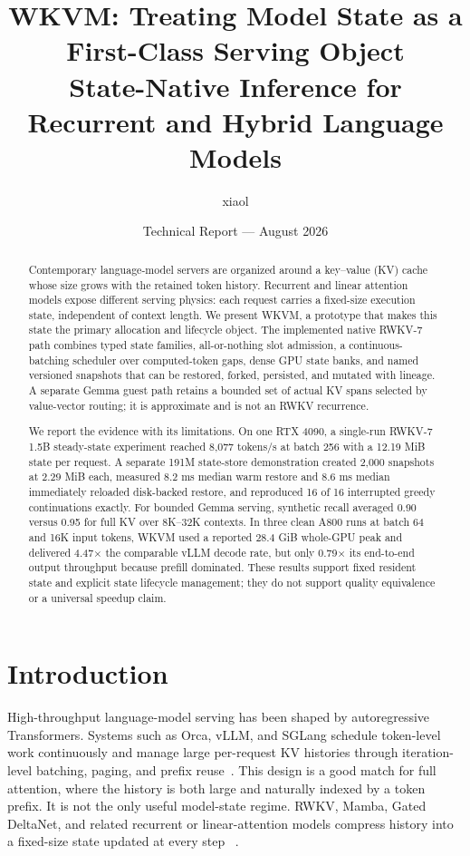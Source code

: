 \documentclass[10pt,letterpaper]{article}
\title{\textbf{WKVM: Treating Model State as a First-Class Serving Object}\\
\large State-Native Inference for Recurrent and Hybrid Language Models}
\author{xiaol}
\date{Technical Report --- August 2026}
\newcommand{\wkvm}{\textsc{WKVM}}
\begin{document}
\maketitle

\begin{abstract}
Contemporary language-model servers are organized around a key--value (KV)
cache whose size grows with the retained token history.  Recurrent and linear
attention models expose different serving physics: each request carries a
fixed-size execution state, independent of context length.  We present
\wkvm, a prototype that makes this state the primary allocation and lifecycle
object.  The implemented native RWKV-7 path combines typed state families,
all-or-nothing slot admission, a continuous-batching scheduler over
computed-token gaps, dense GPU state banks, and named versioned snapshots that
can be restored, forked, persisted, and mutated with lineage.  A separate Gemma
guest path retains a bounded set of actual KV spans selected by value-vector
routing; it is approximate and is not an RWKV recurrence.

We report the evidence with its limitations.  On one RTX 4090, a single-run
RWKV-7 1.5B steady-state experiment reached 8,077 tokens/s at batch 256 with a
12.19 MiB state per request.  A separate 191M state-store demonstration created
2,000 snapshots at 2.29 MiB each, measured 8.2 ms median warm restore and 8.6 ms
median immediately reloaded disk-backed restore, and reproduced 16 of 16
interrupted greedy continuations exactly.  For bounded Gemma serving, synthetic
recall averaged 0.90 versus 0.95 for full KV over 8K--32K contexts.  In three
clean A800 runs at batch 64 and 16K input tokens, \wkvm{} used a reported
28.4 GiB whole-GPU peak and delivered 4.47$\times$ the comparable vLLM decode
rate, but only 0.79$\times$ its end-to-end output throughput because prefill
dominated.  These results support fixed resident state and explicit state
lifecycle management; they do not support quality equivalence or a universal
speedup claim.
\end{abstract}

\section{Introduction}

High-throughput language-model serving has been shaped by autoregressive
Transformers.  Systems such as Orca, vLLM, and SGLang schedule token-level work
continuously and manage large per-request KV histories through iteration-level
batching, paging, and prefix reuse~\cite{orca,vllm,sglang}.  This design is a
good match for full attention, where the history is both large and naturally
indexed by a token prefix.  It is not the only useful model-state regime.
RWKV, Mamba, Gated DeltaNet, and related recurrent or linear-attention models
compress history into a fixed-size state updated at every step
~\cite{rwkv,rwkv7,mamba,gateddeltanet}.
\end{document}
